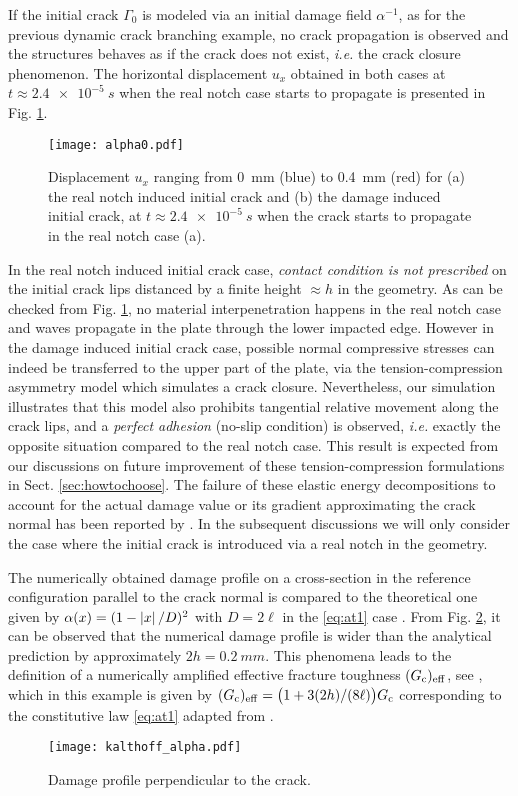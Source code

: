 If the initial crack $\Gamma_0$ is modeled via an initial damage field $\alpha^{-1}$, as for the previous dynamic crack branching example, no crack propagation is observed and the structures behaves as if the crack does not exist, \emph{i.e.} the crack closure phenomenon. The horizontal displacement $u_x$ obtained in both cases at $t\approx\SI{2.4e-5}{s}$ when the real notch case starts to propagate is presented in Fig. \ref{fig:alpha0}.
\begin{figure}[htbp]
\centering
\texttt{[image: alpha0.pdf]}
\caption{Displacement $u_x$ ranging from \SI{0}{mm} (blue) to \SI{0.4}{mm} (red) for (a) the real notch induced initial crack and (b) the damage induced initial crack, at $t\approx\SI{2.4e-5}{s}$ when the crack starts to propagate in the real notch case (a).} \label{fig:alpha0}
\end{figure}
In the real notch induced initial crack case, \emph{contact condition is not prescribed} on the initial crack lips distanced by a finite height $\approx h$ in the geometry. As can be checked from Fig. \ref{fig:alpha0}, no material interpenetration happens in the real notch case and waves propagate in the plate through the lower impacted edge. However in the damage induced initial crack case, possible normal compressive stresses can indeed be transferred to the upper part of the plate, via the tension-compression asymmetry model \cite{FreddiRoyer-Carfagni:2010} which simulates a crack closure. Nevertheless, our simulation illustrates that this model also prohibits tangential relative movement along the crack lips, and a \emph{perfect adhesion} (no-slip condition) is observed, \emph{i.e.} exactly the opposite situation compared to the real notch case. This result is expected from our discussions on future improvement of these tension-compression formulations in Sect. \ref{sec:howtochoose}. The failure of these elastic energy decompositions to account for the actual damage value or its gradient approximating the crack normal has been reported by \cite{MayVignolletBorst:2015}. In the subsequent discussions we will only consider the case where the initial crack is introduced via a real notch in the geometry.

The numerically obtained damage profile on a cross-section in the reference configuration parallel to the crack normal is compared to the theoretical one given by $\alpha(x)=(1-\left\lvert{x}\right\rvert/D)^2$ with $D=2\ell$ in the \eqref{eq:at1} case \cite{PhamAmorMarigoMaurini:2011}. From Fig. \ref{fig:damageprofile}, it can be observed that the numerical damage profile is wider than the analytical prediction by approximately $2h=\SI{0.2}{mm}$. This phenomena leads to the definition of a numerically amplified effective fracture toughness $(G_\mathrm{c})_\mathrm{eff}$, see \cite{BourdinFrancfortMarigo:2008}, which in this example is given by $(G_\mathrm{c})_\mathrm{eff}=\bigl(1+3(2h)/(8\ell)\bigr)G_\mathrm{c}$ corresponding to the constitutive law \eqref{eq:at1} adapted from \cite{HossainHsuehBourdinBhattachary:2014}.
\begin{figure}[htbp]
\centering
\texttt{[image: kalthoff\_alpha.pdf]}
\caption{Damage profile perpendicular to the crack.} \label{fig:damageprofile}
\end{figure}

